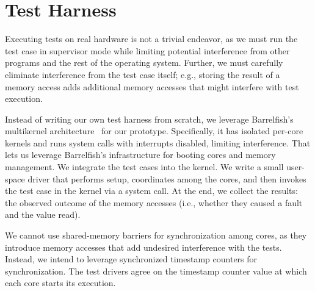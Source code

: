 \section{Test Harness}\label{sec:harness}

Executing tests on real hardware is not a trivial endeavor, as we must run the test case in supervisor mode while limiting potential interference from other programs and the rest of the operating system. 
Further, we must carefully eliminate interference from the test case itself; e.g., storing the result of a memory access adds additional memory accesses that might interfere with test execution.

Instead of writing our own test harness from scratch, we leverage Barrelfish's multikernel architecture~\cite{Baumann:2009:Multikernel} for our prototype. Specifically, it has isolated per-core kernels and runs system calls with interrupts disabled, limiting interference.
That lets us leverage Barrelfish's infrastructure for booting cores and memory management.
We integrate the test cases into the kernel. We write a small user-space driver that performs setup, coordinates among the cores, and then invokes the test case in the kernel via a system call.
At the end, we collect the results: the observed outcome of the memory accesses (i.e., whether they caused a fault and the value read).

We cannot use shared-memory barriers for synchronization among cores, as they introduce memory accesses that add undesired interference with the tests. Instead, we intend to leverage synchronized timestamp counters for synchronization. The test drivers agree on the timestamp counter value at which each core starts its execution.
